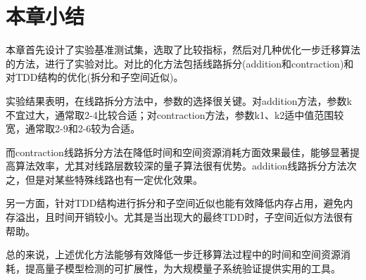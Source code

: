 \section{本章小结}
本章首先设计了实验基准测试集，选取了比较指标，然后对几种优化一步迁移算法的方法，进行了实验对比。对比的化方法包括线路拆分(addition和contraction)和对TDD结构的优化(拆分和子空间近似)。

实验结果表明，在线路拆分方法中，参数的选择很关键。对addition方法，参数k不宜过大，通常取2-4比较合适；对contraction方法，参数k1、k2适中值范围较宽，通常取2-9和2-6较为合适。

而contraction线路拆分方法在降低时间和空间资源消耗方面效果最佳，能够显著提高算法效率，尤其对线路层数较深的量子算法很有优势。addition线路拆分方法次之，但是对某些特殊线路也有一定优化效果。

另一方面，针对TDD结构进行拆分和子空间近似也能有效降低内存占用，避免内存溢出，且时间开销较小。尤其是当出现大的最终TDD时，子空间近似方法很有帮助。

总的来说，上述优化方法能够有效降低一步迁移算法过程中的时间和空间资源消耗，提高量子模型检测的可扩展性，为大规模量子系统验证提供实用的工具。